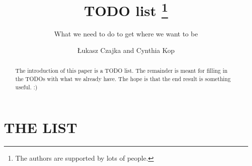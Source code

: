 \documentclass[runningheads,a4paper]{llncs}
\begin{document}
\mainmatter

\title{TODO list
  \thanks{The authors are supported by lots of people.}}
\subtitle{What we need to do to get where we want to be}

\author{{\L}ukasz Czajka and Cynthia Kop}

\maketitle

\begin{abstract}
The introduction of this paper is a TODO list.
The remainder is meant for filling in the TODOs with what we already
have.
The hope is that the end result is something useful. :)
\end{abstract}

\section*{THE LIST}

\renewcommand{\theenumii}{\arabic{enumi}.\arabic{enumii}}
\end{document}

